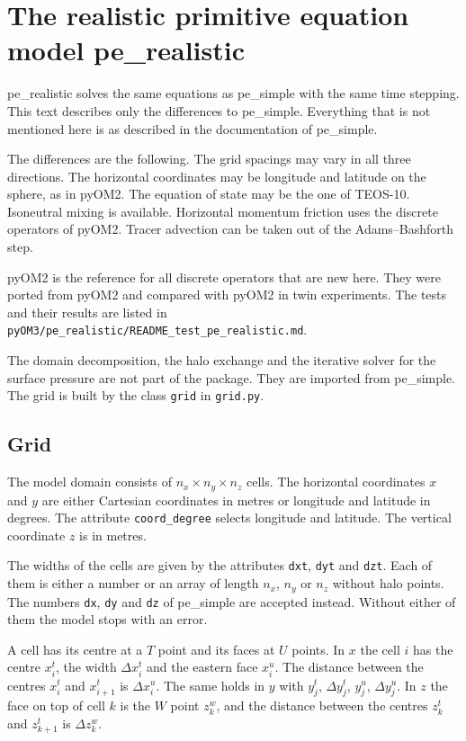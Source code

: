 \documentclass[12pt]{article}
\begin{document}
 \section*{The realistic primitive equation model pe\_realistic}

pe\_realistic solves the same equations as pe\_simple with the same time stepping.
This text describes only the differences to pe\_simple.
Everything that is not mentioned here is as described in the documentation of pe\_simple.

The differences are the following.
The grid spacings may vary in all three directions.
The horizontal coordinates may be longitude and latitude on the sphere, as in pyOM2.
The equation of state may be the one of TEOS-10.
Isoneutral mixing is available.
Horizontal momentum friction uses the discrete operators of pyOM2.
Tracer advection can be taken out of the Adams--Bashforth step.

pyOM2 is the reference for all discrete operators that are new here.
They were ported from pyOM2 and compared with pyOM2 in twin experiments.
The tests and their results are listed in \verb|pyOM3/pe_realistic/README_test_pe_realistic.md|.

The domain decomposition, the halo exchange and the iterative solver for the surface pressure are not part of the package.
They are imported from pe\_simple.
The grid is built by the class \verb|grid| in \verb|grid.py|.

\subsection*{Grid}

The model domain consists of $n_x \times n_y \times n_z$ cells.
The horizontal coordinates $x$ and $y$ are either Cartesian coordinates in metres or longitude and latitude in degrees.
The attribute \verb|coord_degree| selects longitude and latitude.
The vertical coordinate $z$ is in metres.

The widths of the cells are given by the attributes \verb|dxt|, \verb|dyt| and \verb|dzt|.
Each of them is either a number or an array of length $n_x$, $n_y$ or $n_z$ without halo points.
The numbers \verb|dx|, \verb|dy| and \verb|dz| of pe\_simple are accepted instead.
Without either of them the model stops with an error.

A cell has its centre at a $T$ point and its faces at $U$ points.
In $x$ the cell $i$ has the centre $x^t_i$, the width $\Delta x^t_i$ and the eastern face $x^u_i$.
The distance between the centres $x^t_i$ and $x^t_{i+1}$ is $\Delta x^u_i$.
The same holds in $y$ with $y^t_j$, $\Delta y^t_j$, $y^u_j$, $\Delta y^u_j$.
In $z$ the face on top of cell $k$ is the $W$ point $z^w_k$, and the distance between the centres $z^t_k$ and $z^t_{k+1}$ is $\Delta z^w_k$.
\end{document}
